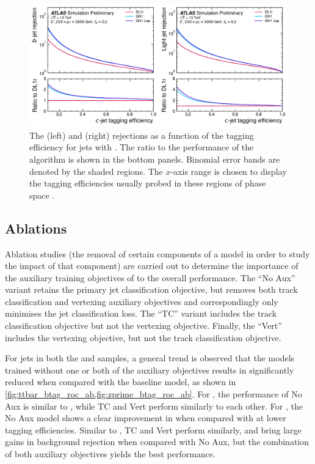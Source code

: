 \begin{figure}[!p]
   \centering
   \includegraphics[width=\textwidth]{chapters/gnn_tagger/figs/results/main/zprime/zprime_roc_ctag.pdf}
   \caption{
        The \bjet (left) and \ljet (right) rejections as a function of the \cjet tagging efficiency for \Zprime jets with \Zprimept.
        The ratio to the performance of the \DLr algorithm is shown in the bottom panels.
        Binomial error bands are denoted by the shaded regions.
        The $x$-axis range is chosen to display the \cjet tagging efficiencies usually probed in these regions of phase space \cite{ATL-PHYS-PUB-2022-027}.
    }
   \label{fig:zprime_ctag_roc}
\end{figure}




\subsection{Ablations}\label{sec:gnn_ablations}

Ablation studies (the removal of certain components of a model in order to study the impact of that component) are carried out to determine the importance of the auxiliary training objectives of \GNN to the overall performance.
The ``\GNN No Aux'' variant retains the primary jet classification objective, but removes both track classification and vertexing auxiliary objectives and correspondingly only minimises the jet classification loss.
The ``\GNN TC'' variant includes the track classification objective but not the vertexing objective.
Finally, the ``\GNN Vert'' includes the vertexing objective, but not the track classification objective.

For jets in both the \ttbar and \Zprime samples, a general trend is observed that the models trained without one or both of the auxiliary objectives results in significantly reduced \clrej when compared with the baseline \GNN model, as shown in \cref{fig:ttbar_btag_roc_ab,fig:zprime_btag_roc_ab}.
For \ttbarjets, the performance of \GNN No Aux is similar to \DLr, while \GNN TC and \GNN Vert perform similarly to each other.
For \Zprimejets, the \GNN No Aux model shows a clear improvement in \clrej when compared with \DLr at lower \bjet tagging efficiencies.
Similar to \ttbarjets, \GNN TC and \GNN Vert perform similarly, and bring large gains in background rejection when compared with \GNN No Aux, but the combination of both auxiliary objectives yields the best performance.

